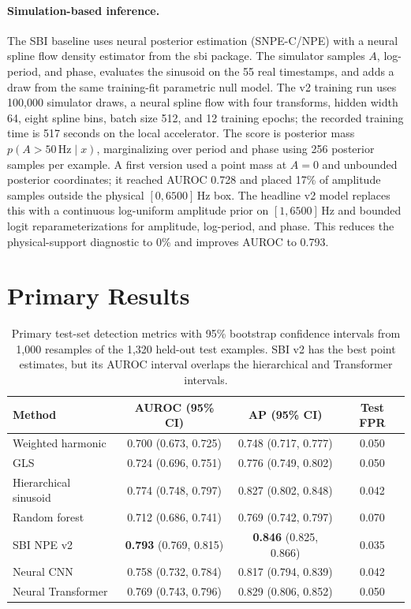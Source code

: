 \documentclass{article}
\newcommand{\hz}{\,\mathrm{Hz}}
\begin{document}
\paragraph{Simulation-based inference.}
The SBI baseline uses neural posterior estimation (SNPE-C/NPE) with a neural spline flow density estimator from the sbi package.  The simulator samples \(A\), log-period, and phase, evaluates the sinusoid on the 55 real timestamps, and adds a draw from the same training-fit parametric null model.  The v2 training run uses 100,000 simulator draws, a neural spline flow with four transforms, hidden width 64, eight spline bins, batch size 512, and 12 training epochs; the recorded training time is 517 seconds on the local accelerator.  The score is posterior mass \(p(A>50\hz\mid x)\), marginalizing over period and phase using 256 posterior samples per example.  A first version used a point mass at \(A=0\) and unbounded posterior coordinates; it reached AUROC 0.728 and placed 17\% of amplitude samples outside the physical \([0,6500]\hz\) box.  The headline v2 model replaces this with a continuous log-uniform amplitude prior on \([1,6500]\hz\) and bounded logit reparameterizations for amplitude, log-period, and phase.  This reduces the physical-support diagnostic to 0\% and improves AUROC to 0.793.

\section{Primary Results}

\begin{table}[t]
  \centering
  \small
  \setlength{\tabcolsep}{6pt}
  \caption{Primary test-set detection metrics with 95\% bootstrap confidence intervals from 1,000 resamples of the 1,320 held-out test examples.  SBI v2 has the best point estimates, but its AUROC interval overlaps the hierarchical and Transformer intervals.}
  \label{tab:main}
  \begin{tabular}{lccc}
    \toprule
    Method & AUROC (95\% CI) & AP (95\% CI) & Test FPR \\
    \midrule
    Weighted harmonic & 0.700 (0.673, 0.725) & 0.748 (0.717, 0.777) & 0.050 \\
    GLS & 0.724 (0.696, 0.751) & 0.776 (0.749, 0.802) & 0.050 \\
    Hierarchical sinusoid & 0.774 (0.748, 0.797) & 0.827 (0.802, 0.848) & 0.042 \\
    Random forest & 0.712 (0.686, 0.741) & 0.769 (0.742, 0.797) & 0.070 \\
    SBI NPE v2 & \textbf{0.793} (0.769, 0.815) & \textbf{0.846} (0.825, 0.866) & 0.035 \\
    Neural CNN & 0.758 (0.732, 0.784) & 0.817 (0.794, 0.839) & 0.042 \\
    Neural Transformer & 0.769 (0.743, 0.796) & 0.829 (0.806, 0.852) & 0.050 \\
    \bottomrule
  \end{tabular}
\end{table}
\end{document}
